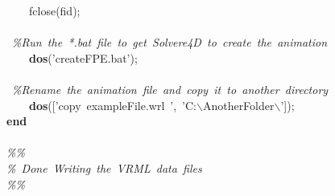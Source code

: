 \documentclass{article}
\newcommand{\hlstd}[1]{\textcolor[rgb]{0,0,0}{#1}}
\newcommand{\hlkey}[1]{\textcolor[rgb]{0,0,1}{\bf{#1}}}
\newcommand{\hltyp}[1]{\textcolor[rgb]{0,0,1}{#1}}
\newcommand{\hlcom}[1]{\textcolor[rgb]{0.4,0.4,0.4}{\it{#1}}}
\begin{document}
{\hlstd{\ \ \ \ }}\hltyp{fclose}\hlstd{(fid);\mbox{}\\
\\
\ }\hlcom{\%Run\ the\ *.bat\ file\ to\ get\ Solvere4D\ to\ create\ the\ animation\\
}\hlstd{\hlstd{\ \ \ \ }}\hlkey{dos}\hlstd{('createFPE.bat');\mbox{}\\
\\
\ }\hlcom{\%Rename\ the\ animation\ file\ and\ copy\ it\ to\ another\ directory\\
}\hlstd{\hlstd{\ \ \ \ }}\hlkey{dos}\hlstd{(['copy\ exampleFile.wrl\ ',\ 'C:$\backslash$AnotherFolder$\backslash$']);\\
}\hlkey{end\mbox{}\\
\\
}\hlstd{}\hlcom{\%\%\\
}\hlstd{}\hlcom{\%\ Done\ Writing\ the\ VRML\ data\ files\\
}\hlstd{}\hlcom{\%\%}\hlstd{}\\
\mbox{}\\
\normalfont
\end{document}
